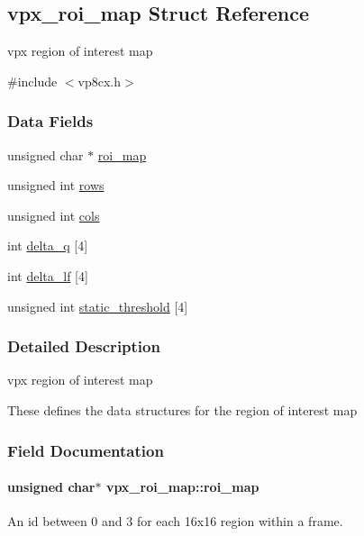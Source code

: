 \hypertarget{structvpx__roi__map}{}\subsection{vpx\+\_\+roi\+\_\+map Struct Reference}
\label{structvpx__roi__map}


vpx region of interest map  




{\ttfamily \#include $<$vp8cx.\+h$>$}

\subsubsection*{Data Fields}
\begin{DoxyCompactItemize}
\item 
unsigned char $\ast$ \hyperlink{structvpx__roi__map_aba69e211b81d622977ba07ac47b61075}{roi\+\_\+map}
\item 
unsigned int \hyperlink{structvpx__roi__map_a3fdcecd472553d08a99ced02cda5c9a6}{rows}
\item 
unsigned int \hyperlink{structvpx__roi__map_a5458459aaf16b14b86fb0adef32757c8}{cols}
\item 
int \hyperlink{structvpx__roi__map_a6e7aecf1d31c329f43dcb36717b3999b}{delta\+\_\+q} \mbox{[}4\mbox{]}
\item 
int \hyperlink{structvpx__roi__map_a5164be48a612bf872b81e0a86726fbed}{delta\+\_\+lf} \mbox{[}4\mbox{]}
\item 
unsigned int \hyperlink{structvpx__roi__map_a3354ff458e229361b53a0b2d1bf68cfb}{static\+\_\+threshold} \mbox{[}4\mbox{]}
\end{DoxyCompactItemize}


\subsubsection{Detailed Description}
vpx region of interest map 

These defines the data structures for the region of interest map 

\subsubsection{Field Documentation}
\paragraph[{\texorpdfstring{roi\+\_\+map}{roi_map}}]{\setlength{\rightskip}{0pt plus 5cm}unsigned char$\ast$ vpx\+\_\+roi\+\_\+map\+::roi\+\_\+map}\hypertarget{structvpx__roi__map_aba69e211b81d622977ba07ac47b61075}{}\label{structvpx__roi__map_aba69e211b81d622977ba07ac47b61075}
An id between 0 and 3 for each 16x16 region within a frame. 
